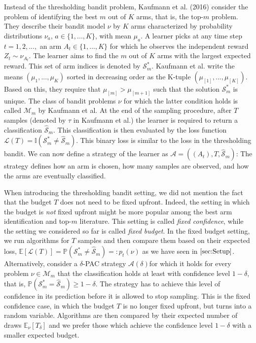 \documentclass[11pt,]{article}
\begin{document}
Instead of the thresholding bandit problem, Kaufmann et al. (2016)
consider the problem of identifying the best \(m\) out of \(K\) arms,
that is, the top-\(m\) problem. They describe their bandit model \(\nu\)
by \(K\) arms characterized by probability distributions \(\nu_a\),
\(a \in \{1,...,K\}\), with mean \(\mu_a\). A learner picks at any time
step \(t=1,2,...,\) an arm \(A_t \in \{1,...,K\}\) for which he observes
the independent reward \(Z_{t} \sim \nu_{A_t}\). The learner aims to
find the \(m\) out of \(K\) arms with the largest expected reward. This
set of arm indices is denoted by \(\mathcal{S}_m^*\). Kaufmann et al.
write the means \((\mu_{1}, ..., \mu_{K})\) sorted in decreasing order
as the K-tuple \((\mu_{[1]}, ..., \mu_{[K]})\). Based on this, they
require that \(\mu_{[m]} > \mu_{[m+1]}\) such that the solution
\(\mathcal{S}_m^*\) is unique. The class of bandit problems \(\nu\) for
which the latter condition holds is called \(\mathcal{M}_m\) by Kaufmann
et al. At the end of the sampling procedure, after \(T\) samples
(denoted by \(\tau\) in Kaufmann et al.) the learner is required to
return a classification \(\hat{\mathcal{S}}_m\). This classification is
then evaluated by the loss function
\(\mathcal{L}(T) = \mathbb{I}(\mathcal{S}^*_m \neq \hat{\mathcal{S}}_m)\).
This binary loss is similar to the loss in the thresholding bandit. We
can now define a strategy of the learner as
\(\mathcal{A} = ((A_t), T, \hat{\mathcal{S}}_m)\): The strategy defines
how an arm is chosen, how many samples are observed, and how the arms
are eventually classified.

When introducing the thresholding bandit setting, we did not mention the
fact that the budget \(T\) does not need to be fixed upfront. Indeed,
the setting in which the budget is \emph{not} fixed upfront might be
more popular among the best arm identification and top-\(m\) literature.
This setting is called \emph{fixed confidence}, while the setting we
considered so far is called \emph{fixed budget}. In the fixed budget
setting, we run algorithms for \(T\) samples and then compare them based
on their expected loss,
\(\mathbb{E}[\mathcal{L}(T)] = \mathbb{P}(\mathcal{S}^*_m \neq \hat{\mathcal{S}}_m) =: p_t(\nu)\)
as we have seen in \(\autoref{sec:Setup}\). Alternatively, consider a
\(\delta\)-PAC strategy \(\mathcal{A}(\delta)\)for which it holds for
every problem \(\nu \in \mathcal{M}_m\) that the classification holds at
least with confidence level \(1-\delta\), that is,
\(\mathbb{P}(\mathcal{S}^*_m = \hat{\mathcal{S}}_m) \geq 1-\delta\). The
strategy has to achieve this level of confidence in its prediction
before it is allowed to stop sampling. This is the fixed confidence
case, in which the budget \(T\) is no longer fixed upfront, but turns
into a random variable. Algorithms are then compared by their expected
number of draws \(\mathbb{E}_{\nu}[T_{\delta}]\) and we prefer those
which achieve the confidence level \(1-\delta\) with a smaller expected
budget.
\end{document}
